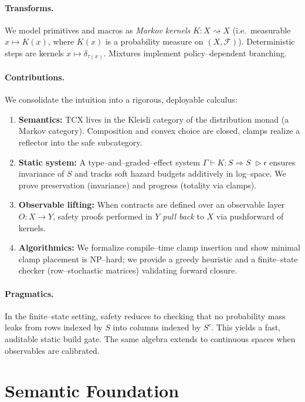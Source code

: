 \documentclass[11pt]{article}
\theoremstyle{definition}
\theoremstyle{plain}
\theoremstyle{remark}
\newcommand{\X}{X}
\newcommand{\F}{\mathcal{F}}
\newcommand{\1}{\mathbf{1}}
\newcommand{\grade}{\mathsf{r}}
\begin{document}
\paragraph{Transforms.} We model primitives and macros as \emph{Markov kernels} $K:\X\rightsquigarrow \X$ (i.e.\ measurable $x\mapsto K(x)$, where $K(x)$ is a probability measure on $(\X,\F)$). Deterministic steps are kernels $x\mapsto\delta_{\tau(x)}$. Mixtures implement policy--dependent branching.

\paragraph{Contributions.} We consolidate the intuition into a rigorous, deployable calculus:
\begin{enumerate}[leftmargin=*]
  \item \textbf{Semantics:} TCX lives in the Kleisli category of the distribution monad (a Markov category). Composition and convex choice are closed, clamps realize a reflector into the safe subcategory.
  \item \textbf{Static system:} A type--and--graded--effect system $\Gamma\vdash K: S\Rightarrow S\;\triangleright \grade$ ensures invariance of $S$ and tracks soft hazard budgets additively in log--space. We prove preservation (invariance) and progress (totality via clamps).
  \item \textbf{Observable lifting:} When contracts are defined over an observable layer $O:\X\to Y$, safety proofs performed in $Y$ \emph{pull back} to $\X$ via pushforward of kernels.
  \item \textbf{Algorithmics:} We formalize compile--time clamp insertion and show minimal clamp placement is NP--hard; we provide a greedy heuristic and a finite--state checker (row--stochastic matrices) validating forward closure.
\end{enumerate}

\paragraph{Pragmatics.} In the finite--state setting, safety reduces to checking that no probability mass leaks from rows indexed by $S$ into columns indexed by $S^c$. This yields a fast, auditable static build gate. The same algebra extends to continuous spaces when observables are calibrated.

\section{Semantic Foundation}
\end{document}
